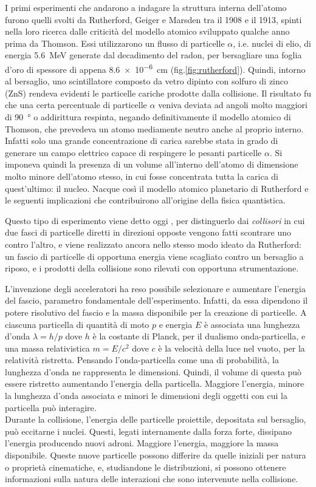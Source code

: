 \documentclass[../main.tex]{subfiles}
\begin{document}
I primi esperimenti che andarono a indagare la struttura interna dell'atomo furono quelli svolti da Rutherford, Geiger e Marsden tra il 1908 e il 1913, spinti nella loro ricerca dalle criticità del modello atomico sviluppato qualche anno prima da Thomson. Essi utilizzarono un flusso di particelle $\alpha$, i.e. nuclei di elio, di energia \SI{5.6}{\MeV} generate dal decadimento del radon, per bersagliare una foglia d'oro di spessore di appena \SI{8.6e-6}{\cm} (fig.\ref{fig:rutherford}). Quindi, intorno al bersaglio, uno scintillatore composto da vetro dipinto con solfuro di zinco (ZnS) rendeva evidenti le particelle cariche prodotte dalla collisione. Il risultato fu che una certa percentuale di particelle $\alpha$ veniva deviata ad angoli molto maggiori di \SI{90}{°} o addirittura respinta, negando definitivamente il modello atomico di Thomson, che prevedeva un atomo mediamente neutro anche al proprio interno. Infatti solo una grande concentrazione di carica sarebbe stata in grado di generare un campo elettrico capace di respingere le pesanti particelle $\alpha$. Si imponeva quindi la presenza di un volume all'interno dell'atomo di dimensione molto minore dell'atomo stesso, in cui fosse concentrata tutta la carica di quest'ultimo: il nucleo. Nacque così il modello atomico planetario di Rutherford e le seguenti implicazioni che contribuirono all'origine della fisica quantistica.

Questo tipo di esperimento viene detto oggi , per distinguerlo dai \textit{collisori} in cui due fasci di particelle diretti in direzioni opposte vengono fatti scontrare uno contro l'altro, e viene realizzato ancora nello stesso modo ideato da Rutherford: un fascio di particelle di opportuna energia viene scagliato contro un bersaglio a riposo, e i prodotti della collisione sono rilevati con opportuna strumentazione.

L'invenzione degli acceleratori ha reso possibile selezionare e aumentare l'energia del fascio, parametro fondamentale dell'esperimento.
Infatti, da essa dipendono il potere risolutivo del fascio e la massa disponibile per la creazione di particelle.
A ciascuna particella di quantità di moto $p$ e energia $E$ è associata una lunghezza d'onda $\lambda = h / p $ dove $h$ è la costante di Planck, per il dualismo onda-particella, e una massa relativistica $m = E / c^2$ dove $c$ è la velocità della luce nel vuoto, per la relatività ristretta. 
Pensando l'onda-particella come una  di probabilità, la lunghezza d'onda ne rappresenta le dimensioni. Quindi, il volume di questa  può essere ristretto aumentando l'energia della particella. Maggiore l'energia, minore la lunghezza d'onda associata e minori le dimensioni degli oggetti con cui la particella può interagire. \\ Durante la collisione, l'energia delle particelle proiettile, depositata sul bersaglio, può eccitarne i nuclei. Questi, legati internamente dalla forza forte, dissipano l'energia producendo nuovi adroni. Maggiore l'energia, maggiore la massa disponibile.
Queste nuove particelle possono differire da quelle iniziali per natura o proprietà cinematiche, e, studiandone le distribuzioni, si possono ottenere informazioni sulla natura delle interazioni che sono intervenute nella collisione.
\end{document}

